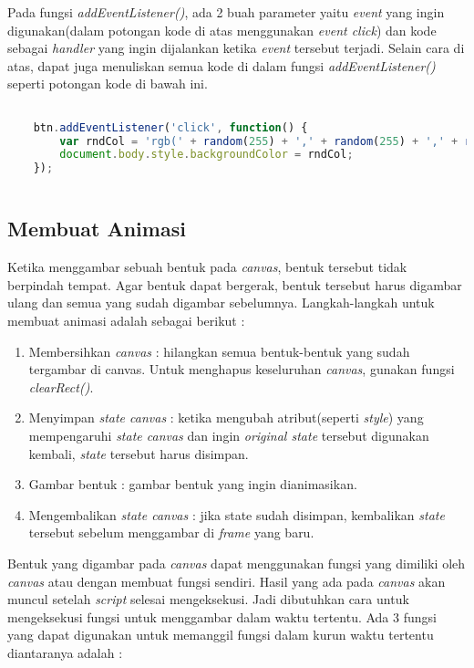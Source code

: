 Pada fungsi \textit{addEventListener()}, ada 2 buah parameter yaitu \textit{event} yang ingin digunakan(dalam potongan kode di atas menggunakan \textit{event click}) dan kode sebagai \textit{handler} yang ingin dijalankan ketika \textit{event} tersebut terjadi. Selain cara di atas, dapat juga menuliskan semua kode di dalam fungsi \textit{addEventListener()} seperti potongan kode di bawah ini.

\begin{lstlisting}[language=Javascript, caption=Menuliskan kode di dalam fungsi addEventListener()]

	btn.addEventListener('click', function() {
  		var rndCol = 'rgb(' + random(255) + ',' + random(255) + ',' + random(255) + ')';
  		document.body.style.backgroundColor = rndCol;
	});
	
\end{lstlisting}


\subsection{Membuat Animasi}
Ketika menggambar sebuah bentuk pada \textit{canvas}, bentuk tersebut tidak berpindah tempat. Agar bentuk dapat bergerak, bentuk tersebut harus digambar ulang dan semua yang sudah digambar sebelumnya. Langkah-langkah untuk membuat animasi adalah sebagai berikut :

\begin{enumerate}
	\item Membersihkan \textit{canvas} : hilangkan semua bentuk-bentuk yang sudah tergambar di canvas. Untuk menghapus keseluruhan \textit{canvas}, gunakan fungsi \textit{clearRect()}.
	\item Menyimpan \textit{state canvas} : ketika mengubah atribut(seperti \textit{style}) yang mempengaruhi \textit{state canvas} dan ingin \textit{original state} tersebut digunakan kembali, \textit{state} tersebut harus disimpan. 
	\item Gambar bentuk : gambar bentuk yang ingin dianimasikan.
	\item Mengembalikan \textit{state canvas} : jika state sudah disimpan, kembalikan \textit{state} tersebut sebelum menggambar di \textit{frame} yang baru.
\end{enumerate}

Bentuk yang digambar pada \textit{canvas} dapat menggunakan fungsi yang dimiliki oleh \textit{canvas} atau dengan membuat fungsi sendiri. Hasil yang ada pada \textit{canvas} akan muncul setelah \textit{script} selesai mengeksekusi. Jadi dibutuhkan cara untuk mengeksekusi fungsi untuk menggambar dalam waktu tertentu. Ada 3 fungsi yang dapat digunakan untuk memanggil fungsi dalam kurun waktu tertentu diantaranya adalah :

